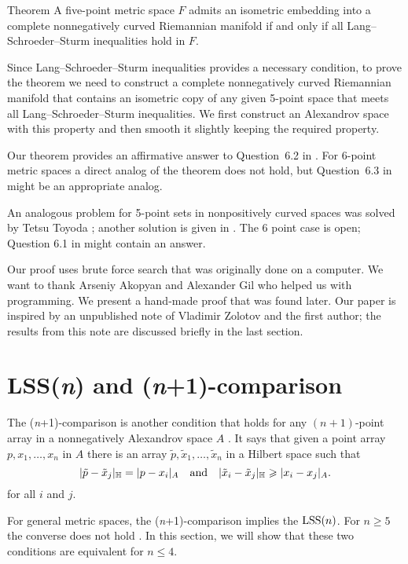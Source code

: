 \documentclass{article}
\begin{document}
\begin{thm}{Theorem}\label{thm:main}
A five-point metric space $F$ admits an isometric embedding into a complete nonnegatively curved Riemannian manifold
if and only if all Lang--Schroeder--Sturm inequalities hold in $F$.
\end{thm}

Since Lang--Schroeder--Sturm inequalities provides a necessary condition,
to prove the theorem we need to construct a complete nonnegatively curved Riemannian manifold that contains an isometric copy of any given 5-point space that meets all Lang--Schroeder--Sturm inequalities.
We first construct an Alexandrov space with this property and then smooth it slightly keeping the required property.

Our theorem provides an affirmative answer to Question~6.2 in \cite{lebedeva-petrunin}.
For 6-point metric spaces a direct analog of the theorem does not hold,
but Question~6.3 in \cite{lebedeva-petrunin} might be an appropriate analog.

An analogous problem for 5-point sets in nonpositively curved spaces was solved by Tetsu Toyoda \cite{toyoda}; another solution is given in \cite{lebedeva-petrunin}.
The 6 point case is open;
Question 6.1 in \cite{lebedeva-petrunin} might contain an answer.

Our proof uses brute force search that was originally done on a computer.
We want to thank Arseniy Akopyan and Alexander Gil who helped us with programming.
We present a hand-made proof that was found later.
Our paper is inspired by an unpublished note of Vladimir Zolotov and the first author;
the results from this note are discussed briefly in the last section.


\section{LSS(\textit{n}) and (\textit{n}+1)-comparison}

The (\textit{n}+1)-comparison is another condition that holds for any $(n+1)$-point array in a nonnegatively Alexandrov space $A$ \cite{alexander2019alexandrov}.
It says that given a point array $p,x_1,\dots,x_n$ in $A$ 
there is an array $\tilde p,\tilde x_1,\dots,\tilde x_n$ in a Hilbert space such that 
\[
|\tilde p-\tilde x_j|_{\mathbb H}=|p-x_i|_{A}
\quad
\text{and}
\quad
|\tilde x_i-\tilde x_j|_{\mathbb H}\geqslant |x_i-x_j|_{A}.
\]
for all $i$ and $j$.

For general metric spaces, the (\textit{n}+1)-comparison implies the $\mathrm{LSS}(n)$.
For $n\ge 5$ the converse does not hold \cite[Section 8]{lebedeva-petrunin-zolotov}.
In this section, we will show that these two conditions are equivalent for $n\le 4$.
\end{document}
